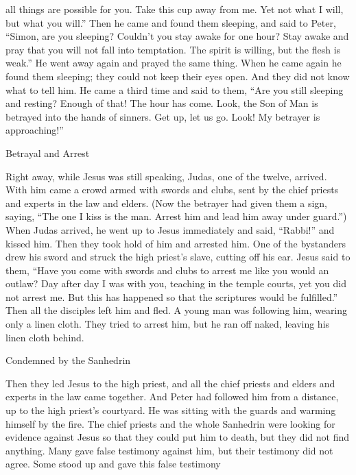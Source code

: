 {all things
are possible
for you.
Take
this
cup
away
from
me.
Yet
not
what
I
will,
but
what
you will.”
Then
he came
and
found
them
sleeping,
and
said
to Peter,
“Simon,
are you sleeping? Couldn’t you
stay awake
for one
hour?
Stay awake
and
pray
that
you will
not
fall
into
temptation.
The spirit
is willing,
but
the flesh
is weak.”
He went away
again
and prayed
the same thing.
When he came
again
he found
them
sleeping;
they could not keep their eyes
open. And
they did
not
know
what
to tell
him.
He
came
a third time
and
said
to them,
“Are you still sleeping
and
resting? Enough
of that! The hour
has come.
Look,
the Son
of Man
is betrayed
into
the hands
of sinners.
Get up,
let us go.
Look! My
betrayer
is approaching!”
\par }{\SH Betrayal and Arrest
\par }{\PP {}Right away,
while
Jesus was
still
speaking,
Judas,
one
of the twelve,
arrived.
With
him
came a crowd
armed with
swords
and
clubs,
sent by
the chief priests
and
experts in the law
and
elders.
(Now
the betrayer
had given
them a sign,
saying,
“The one
I kiss
is
the man.
Arrest
him
and
lead
him away
under guard.”)
When
Judas arrived,
he went up
to Jesus
immediately
and said,
“Rabbi!” and
kissed
him.
Then they took hold
of him
and
arrested
him.
One
of the bystanders
drew
his sword
and struck
the high priest’s
slave,
cutting off
his
ear.
Jesus
said
to them,
“Have you come
with
swords
and
clubs
to arrest
me
like
you would an outlaw?
Day after day
I was
with
you,
teaching
in
the temple courts,
yet
you did
not
arrest
me.
But
this has happened so that
the scriptures
would be fulfilled.”
Then
all
the disciples left
him
and fled.
A young man
was following
him,
wearing
only a linen cloth.
They tried to arrest
him,
but
he ran off
naked,
leaving
his linen cloth behind.
\par }{\SH Condemned by the Sanhedrin
\par }{\PP {}Then
they led
Jesus
to
the high priest,
and
all
the chief priests
and
elders
and
experts in the law
came together.
And
Peter
had followed
him
from
a distance,
up
to
the high priest’s
courtyard.
He
was
sitting
with
the guards
and
warming
himself by
the fire.
The
chief priests
and
the whole
Sanhedrin
were looking for
evidence
against
Jesus
so
that they could put
him
to death,
but
they did
not
find anything.
Many
gave false testimony
against
him,
but
their
testimony
did
not
agree.
Some
stood up
and gave
this false testimony
}
